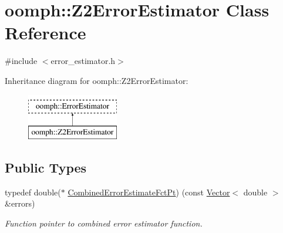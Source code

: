 \hypertarget{classoomph_1_1Z2ErrorEstimator}{}\section{oomph\+:\+:Z2\+Error\+Estimator Class Reference}
\label{classoomph_1_1Z2ErrorEstimator}


{\ttfamily \#include $<$error\+\_\+estimator.\+h$>$}

Inheritance diagram for oomph\+:\+:Z2\+Error\+Estimator\+:\begin{figure}[H]
\begin{center}
\leavevmode
\includegraphics[height=2.000000cm]{classoomph_1_1Z2ErrorEstimator}
\end{center}
\end{figure}
\subsection*{Public Types}
\begin{DoxyCompactItemize}
\item 
typedef double($\ast$ \hyperlink{classoomph_1_1Z2ErrorEstimator_a75ef55e67b21ec49ed1a37d095cfa9f9}{Combined\+Error\+Estimate\+Fct\+Pt}) (const \hyperlink{classoomph_1_1Vector}{Vector}$<$ double $>$ \&errors)
\begin{DoxyCompactList}\small\item\em Function pointer to combined error estimator function. \end{DoxyCompactList}\end{DoxyCompactItemize}
